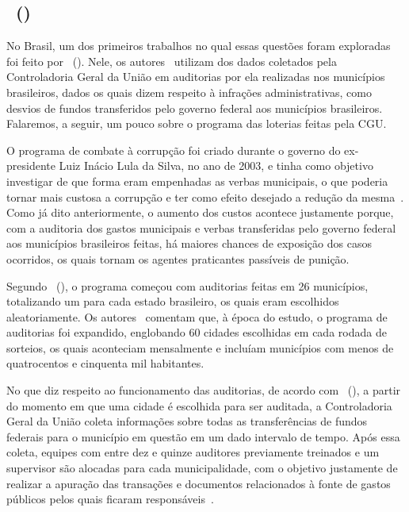 \documentclass[
	12pt,				%
	openright,			%
	twoside,			%
	a4paper,			%
	openany,
	english,			%
	brazil				%
	]{abntex2}
\begin{document}
\subsection{~(\citeyear{ferraz2008exposing})}
No Brasil, um dos primeiros trabalhos no qual essas questões foram exploradas foi feito por ~(\citeyear{ferraz2008exposing}). Nele, os autores~\cite{ferraz2008exposing} utilizam dos dados coletados pela Controladoria Geral da União em auditorias por ela realizadas nos municípios brasileiros, dados os quais dizem respeito à infrações administrativas, como desvios de fundos transferidos pelo governo federal aos municípios brasileiros. Falaremos, a seguir, um pouco sobre o programa das loterias feitas pela CGU.

O programa de combate à corrupção foi criado durante o governo do ex-presidente Luiz Inácio Lula da Silva, no ano de 2003, e tinha como objetivo investigar de que forma eram empenhadas as verbas municipais, o que poderia tornar mais custosa a corrupção e ter como efeito desejado a redução da mesma~\cite{ferraz2008exposing}. Como já dito anteriormente, o aumento dos custos acontece justamente porque, com a auditoria dos gastos municipais e verbas transferidas pelo governo federal aos municípios brasileiros feitas, há maiores chances de exposição dos casos ocorridos, os quais tornam os agentes praticantes passíveis de punição.

Segundo ~(\citeyear{ferraz2008exposing}), o programa começou com auditorias feitas em 26 municípios, totalizando um para cada estado brasileiro, os quais eram escolhidos aleatoriamente. Os autores~\cite{ferraz2008exposing} comentam que, à época do estudo, o programa de auditorias foi expandido, englobando 60 cidades escolhidas em cada rodada de sorteios, os quais aconteciam mensalmente e incluíam municípios com menos de quatrocentos e cinquenta mil habitantes.

No que diz respeito ao funcionamento das auditorias, de acordo com ~(\citeyear{ferraz2008exposing}), a partir do momento em que uma cidade é escolhida para ser auditada, a Controladoria Geral da União coleta informações sobre todas as transferências de fundos federais para o município em questão em um dado intervalo de tempo. Após essa coleta, equipes com entre dez e quinze auditores previamente treinados e um supervisor são alocadas para cada municipalidade, com o objetivo justamente de realizar a apuração das transações e documentos relacionados à fonte de gastos públicos pelos quais ficaram responsáveis~\cite{ferraz2008exposing}.
\end{document}
